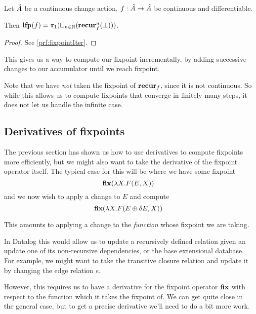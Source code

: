 \begin{thm}[name=Incremental computation of least fixpoints, restate=fixpointIter]
\label{thm:fixpointIter}
  Let $\hat{A}$ be a continuous change action, $f: \hat{A} \rightarrow
  \hat{A}$ be continuous and differentiable.

  Then $\textbf{lfp}(f) = \pi_1(\sqcup_{n \in \mathbb{N}}(\textbf{recur}_f^n(\bot)))$.
\end{thm}
\ifproofs
\begin{proof}
  See \cref{prf:fixpointIter}.
\end{proof}
\fi

This gives us a way to compute our fixpoint incrementally, by adding successive
changes to our accumulator until we reach fixpoint.

Note that we have \emph{not} taken the fixpoint of $\textbf{recur}_f$, since it is
not continuous. So while this allows us to compute fixpoints that converge in
finitely many steps, it does not let us handle the infinite case.

\subsection{Derivatives of fixpoints}
\label{sec:fixpointDerivatives}

The previous section has shown us how to use derivatives to compute fixpoints
more efficiently, but we might also want to take the derivative of the fixpoint
operator itself. The typical case for this will be where we have some fixpoint
\begin{displaymath}
  \textbf{fix} (\lambda X . F(E, X))
\end{displaymath}
and we now wish to apply a change to $E$ and compute
\begin{displaymath}
  \textbf{fix} (\lambda X . F(E \oplus \delta E, X))
\end{displaymath}

This amounts to applying a change to the \emph{function} whose fixpoint we are taking.

In Datalog this would allow us to update a recursively defined relation given an
update one of its non-recursive dependencies, or the base extensional database.
For example, we might want to take the transitive closure relation
and update it by changing the edge relation $e$.

However, this requires us to have a derivative for the fixpoint operator
$\textbf{fix}$ with respect to the function which it takes the fixpoint of.
We can get quite close in the general case, but to get a precise
derivative we'll need to do a bit more work.


